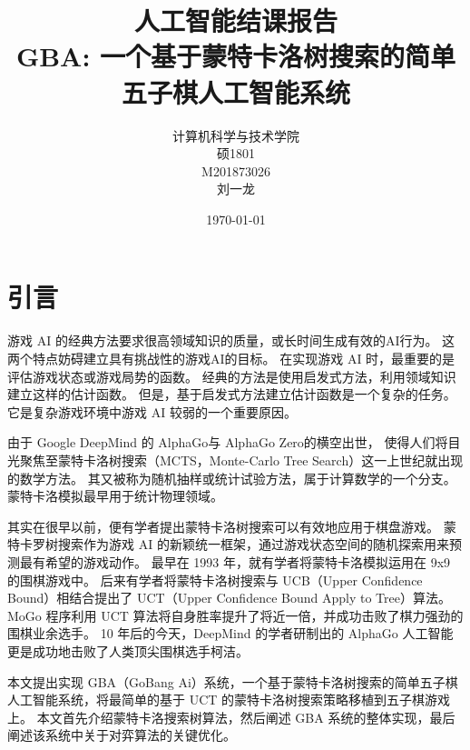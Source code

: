 \documentclass[UTF8,cs4size]{ctexart}
\title{人工智能结课报告\\ \bigskip \textbf{GBA: 一个基于蒙特卡洛树搜索的简单五子棋人工智能系统}}
\author{计算机科学与技术学院\\ 硕1801\\ M201873026\\ 刘一龙}
\date{\today}
\begin{document}
\maketitle
\newpage
\null\thispagestyle{empty}
\newpage


\tableofcontents
\newpage
\null\thispagestyle{empty}
\newpage


\section{引言}
游戏 AI 的经典方法要求很高领域知识的质量，或长时间生成有效的AI行为。
这两个特点妨碍建立具有挑战性的游戏AI的目标。
在实现游戏 AI 时，最重要的是评估游戏状态或游戏局势的函数。
经典的方法是使用启发式方法，利用领域知识建立这样的估计函数。
但是，基于启发式方法建立估计函数是一个复杂的任务。
它是复杂游戏环境中游戏 AI 较弱的一个重要原因。

由于 Google DeepMind 的 AlphaGo\cite{DBLP:journals/nature/SilverHMGSDSAPL16}与 AlphaGo Zero\cite{silver2017mastering}的横空出世，
使得人们将目光聚焦至蒙特卡洛树搜索（MCTS，Monte-Carlo Tree Search）\cite{wiki:Monte_Carlo_tree_search}这一上世纪就出现的数学方法。
其又被称为随机抽样或统计试验方法，属于计算数学的一个分支。蒙特卡洛模拟\cite{binder1993monte}最早用于统计物理领域。

其实在很早以前，便有学者提出蒙特卡洛树搜索可以有效地应用于棋盘游戏\cite{DBLP:conf/aiide/ChaslotBSS08}。
蒙特卡罗树搜索作为游戏 AI 的新颖统一框架，通过游戏状态空间的随机探索用来预测最有希望的游戏动作。
最早在 1993 年\cite{brugmann1993monte}，就有学者将蒙特卡洛模拟运用在 9x9 的围棋游戏中。
后来有学者将蒙特卡洛树搜索与 UCB（Upper Confidence Bound）相结合提出了 UCT（Upper Confidence Bound Apply to Tree）算法\cite{DBLP:conf/ecml/KocsisS06}。
MoGo 程序\cite{DBLP:conf/cig/WangG07}\cite{DBLP:conf/icml/GellyS07}利用 UCT 算法将自身胜率提升了将近一倍，并成功击败了棋力强劲的围棋业余选手。
10 年后的今天，DeepMind 的学者研制出的 AlphaGo 人工智能更是成功地击败了人类顶尖围棋选手柯洁。

本文提出实现 GBA（GoBang Ai）系统，一个基于蒙特卡洛树搜索的简单五子棋人工智能系统，将最简单的基于 UCT 的蒙特卡洛树搜索策略移植到五子棋游戏上。
本文首先介绍蒙特卡洛搜索树算法，然后阐述 GBA 系统的整体实现，最后阐述该系统中关于对弈算法的关键优化。
\newpage
\end{document}
